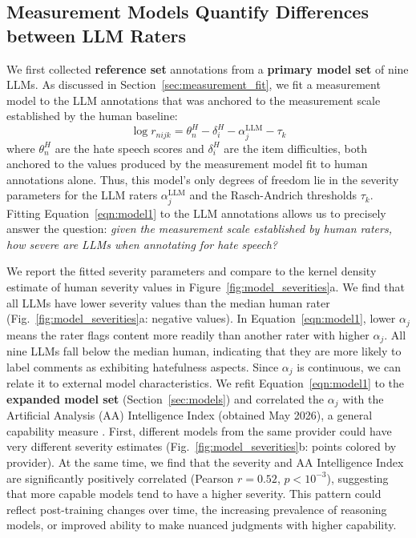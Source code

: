 \documentclass[11pt]{article}
\begin{document}
\subsection{Measurement Models Quantify Differences between LLM Raters}
We first collected \textbf{reference set} annotations from a \textbf{primary model set} of nine LLMs. As discussed in Section~\ref{sec:measurement_fit}, we fit a measurement model to the LLM annotations that was anchored to the measurement scale established by the human baseline:
\begin{equation}
    \log r_{nijk} = \theta_n^{H} - \delta_i^{H} - \alpha_j^{\text{LLM}} - \tau_{k}\label{eqn:model1}
\end{equation}
where $\theta_n^{H}$ are the hate speech scores and $\delta_i^{H}$ are the item difficulties, both anchored to the values produced by the measurement model fit to human annotations alone. Thus, this model's only degrees of freedom lie in the severity parameters for the LLM raters $\alpha_j^{\text{LLM}}$ and the Rasch-Andrich thresholds $\tau_k$. Fitting Equation~\ref{eqn:model1} to the LLM annotations allows us to precisely answer the question: \textit{given the measurement scale established by human raters, how severe are LLMs when annotating for hate speech?}

We report the fitted severity parameters and compare to the kernel density estimate of human severity values in Figure~\ref{fig:model_severities}a. We find that all LLMs have lower severity values than the median human rater (Fig.~\ref{fig:model_severities}a: negative values). In Equation~\ref{eqn:model1}, lower $\alpha_j$ means the rater flags content more readily than another rater with higher $\alpha_j$. All nine LLMs fall below the median human, indicating that they are more likely to label comments as exhibiting hatefulness aspects.  Since $\alpha_j$ is continuous, we can relate it to external model characteristics. We refit Equation~\ref{eqn:model1} to the \textbf{expanded model set} (Section~\ref{sec:models}) and correlated the $\alpha_j$ with the Artificial Analysis (AA) Intelligence Index (obtained May 2026), a general capability measure \cite{ArtificialAnalysis2026Index}. First, different models from the same provider could have very different severity estimates (Fig.~\ref{fig:model_severities}b: points colored by provider). At the same time, we find that the severity and AA Intelligence Index are significantly positively correlated (Pearson $r = 0.52$, $p < 10^{-3}$), suggesting that more capable models tend to have a higher severity. This pattern could reflect post-training changes over time, the increasing prevalence of reasoning models, or improved ability to make nuanced judgments with higher capability.
\end{document}
